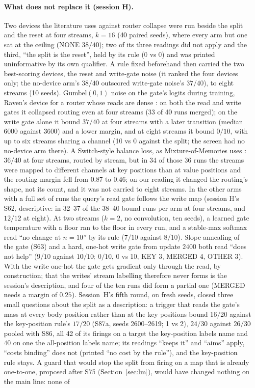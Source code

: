 \documentclass[11pt]{article}
\begin{document}
\paragraph{What does not replace it (session H).} Two devices the literature uses against router collapse were run beside the split and the reset at four streams, $k = 16$ (40 paired seeds), where every arm but one sat at the ceiling (NONE $38/40$); two of its three readings did not apply and the third, ``the split is the reset'', held by its rule (0 vs 0) and was printed uninformative by its own qualifier. A rule fixed beforehand then carried the two best-scoring devices, the reset and write-gate noise (it ranked the four devices only; the no-device arm's $38/40$ outscored write-gate noise's $37/40$), to eight streams (10 seeds). Gumbel$(0,1)$ noise on the gate's logits during training, Raven's device for a router whose reads are dense \cite{raven}: on both the read and write gates it collapsed routing even at four streams (33 of 40 runs merged); on the write gate alone it bound $37/40$ at four streams with a later transition (median 6000 against 3600) and a lower margin, and at eight streams it bound $0/10$, with up to six streams sharing a channel (10 vs 0 against the split; the screen had no no-device arm there). A Switch-style balance loss, as Mixture-of-Memories uses \cite{mom, switch}: $36/40$ at four streams, routed by stream, but in 34 of those 36 runs the streams were mapped to different channels at key positions than at value positions and the routing margin fell from $0.87$ to $0.46$; on our reading it changed the routing's shape, not its count, and it was not carried to eight streams. In the other arms with a full set of runs the query's read gate follows the write map (session H's S62, descriptive: in 32--37 of the 38--40 bound runs per arm at four streams, and $12/12$ at eight). At two streams ($k = 2$, no convolution, ten seeds), a learned gate temperature with a floor ran to the floor in every run, and a stable-max softmax read ``no change at $n = 10$'' by its rule ($7/10$ against $8/10$). Slope annealing of the gate (S63) and a hard, one-hot write gate from update 2400 both read ``does not help'' ($9/10$ against $10/10$; $0/10$, 0 vs 10, KEY 3, MERGED 4, OTHER 3). With the write one-hot the gate gets gradient only through the read, by construction; that the writes' stream labelling therefore never forms is the session's description, and four of the ten runs did form a partial one (MERGED needs a margin of $0.25$). Session~H's fifth round, on fresh seeds, closed three small questions about the split as a description: a trigger that reads the gate's mass at every body position rather than at the key positions bound $16/20$ against the key-position rule's $17/20$ (S87a, seeds 2600--2619; 1 vs 2), $24/30$ against $26/30$ pooled with S86, all 42 of its firings on a target the key-position labels name and 40 on one the all-position labels name; its readings ``keeps it'' and ``aims'' apply, ``costs binding'' does not (printed ``no cost by the rule''), and the key-position rule stays. A guard that would stop the split from firing on a map that is already one-to-one, proposed after S75 (Section~\ref{sec:lm}), would have changed nothing on the main line: none of 
\end{document}
